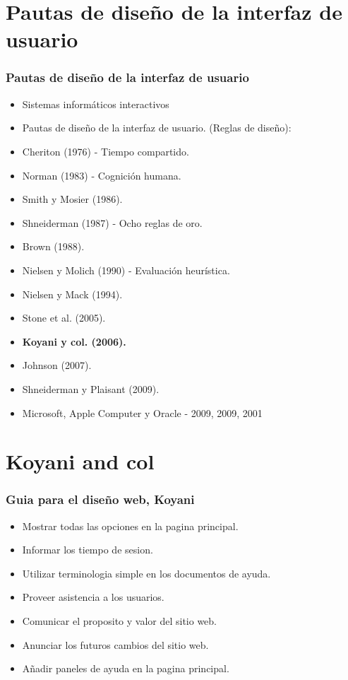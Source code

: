 \documentclass[11pt]{beamer}
\begin{document}
\section{Pautas de diseño de la interfaz de usuario}
\begin{frame}
\frametitle{Pautas de diseño de la interfaz de usuario}
\begin{itemize}
\item Sistemas informáticos interactivos
\item Pautas de diseño de la interfaz de usuario. (Reglas de diseño):
\item Cheriton (1976) - Tiempo compartido.
\item Norman (1983) - Cognición humana.
\item Smith y Mosier (1986).
\item Shneiderman (1987) - Ocho reglas de oro.
\item Brown (1988).
\item Nielsen y Molich (1990) - Evaluación heurística.
\item Nielsen y Mack (1994).
\item Stone et al. (2005).
\item {\bf Koyani y col. (2006).}
\item Johnson (2007).
\item Shneiderman y Plaisant (2009).
\item Microsoft, Apple Computer y Oracle - 2009, 2009, 2001
\end{itemize}
\end{frame}

\section{Koyani and col}
\begin{frame}

\frametitle{Guia para el diseño web, Koyani}
\begin{itemize}
\item Mostrar todas las opciones en la pagina principal.
\item Informar los tiempo de sesion.
\item Utilizar terminologia simple en los documentos de ayuda.
\item Proveer asistencia a los usuarios.
\item Comunicar el proposito y valor del sitio web.
\item Anunciar los futuros cambios del sitio web.
\item Añadir paneles de ayuda en la pagina principal.
\end{itemize}

\end{frame}
\end{document}
